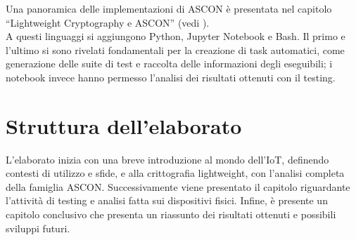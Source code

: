 \noindent Una panoramica delle implementazioni di ASCON è presentata nel capitolo ``Lightweight Cryptography e ASCON'' (vedi ). \\

\noindent A questi linguaggi si aggiungono Python, Jupyter Notebook e Bash. Il primo e l'ultimo si sono rivelati fondamentali per la creazione di task automatici, come generazione delle suite di test e raccolta delle informazioni degli eseguibili; i notebook invece hanno permesso l'analisi dei risultati ottenuti con il testing.

\section{Struttura dell'elaborato}

L'elaborato inizia con una breve introduzione al mondo dell'IoT, definendo contesti di utilizzo e sfide, e alla crittografia lightweight, con l'analisi completa della famiglia ASCON. Successivamente viene presentato il capitolo riguardante l'attività di testing e analisi fatta sui dispositivi fisici. Infine, è presente un capitolo conclusivo che presenta un riassunto dei risultati ottenuti e possibili sviluppi futuri.
